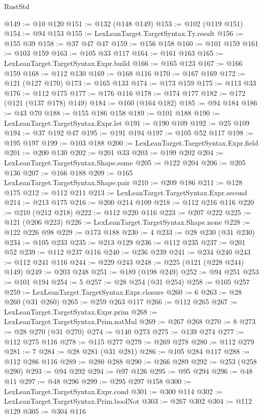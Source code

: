 \begin{lexlean}{RustStd}
\begin{coremodule}
@149 := @10 @120
@151 := @132 (@148 @149)
@153 := @102 (@119 @151)
@154 := @94 @153
@155 := LexLeanTarget.TargetSyntax.Ty.result
@156 := @155 @39
@158 := @37 @47 @47
@159 := @156 @158
@160 := @101 @159
@161 := @103 @159
@163 := @105 @33 @117
@164 := @161 @163
@165 := LexLeanTarget.TargetSyntax.Expr.build
@166 := @165 @123
@167 := @166 @159
@168 := @112 @130
@169 := @168 @116
@170 := @167 @169
@172 := @121 (@127 @170)
@173 := @165 @133
@174 := @173 @159
@175 := @113 @33
@176 := @112 @175
@177 := @176 @116
@178 := @174 @177
@182 := @172 (@121 (@137 @178) @149)
@184 := @160 (@164 @182)
@185 := @94 @184
@186 := @43 @70
@188 := @155 @186 @158
@189 := @101 @188
@190 := LexLeanTarget.TargetSyntax.Expr.let
@191 := @190 @109
@192 := @25 @109
@194 := @37 @192 @47
@195 := @191 @194
@197 := @105 @52 @117
@198 := @195 @197
@199 := @103 @188
@200 := LexLeanTarget.TargetSyntax.Expr.field
@201 := @200 @130
@202 := @201 @33
@203 := @199 @202
@204 := LexLeanTarget.TargetSyntax.Shape.some
@205 := @122 @204
@206 := @205 @136
@207 := @166 @188
@209 := @165 LexLeanTarget.TargetSyntax.Shape.pair
@210 := @209 @186
@211 := @128 @175
@212 := @112 @211
@213 := LexLeanTarget.TargetSyntax.Expr.second
@214 := @213 @175
@216 := @200 @214 @109
@218 := @112 @216 @116
@220 := @210 (@212 @218)
@222 := @112 @220 @116
@223 := @207 @222
@225 := @121 (@206 @223)
@226 := LexLeanTarget.TargetSyntax.Shape.none
@228 := @122 @226 @98
@229 := @173 @188
@230 := 4
@233 := @28 @230 (@31 @230)
@234 := @105 @233
@235 := @213 @129
@236 := @112 @235
@237 := @201 @52
@239 := @112 @237 @116
@240 := @236 @239
@241 := @234 @240
@243 := @112 @241 @116
@244 := @229 @243
@248 := @225 (@121 (@228 @244) @149)
@249 := @203 @248
@251 := @189 (@198 @249)
@252 := @94 @251
@253 := @101 @194
@254 := 5
@257 := @28 @254 (@31 @254)
@258 := @105 @257
@259 := LexLeanTarget.TargetSyntax.Expr.closure
@260 := 6
@263 := @28 @260 (@31 @260)
@265 := @259 @263 @117
@266 := @112 @265
@267 := LexLeanTarget.TargetSyntax.Expr.prim
@268 := LexLeanTarget.TargetSyntax.Prim.natMul
@269 := @267 @268
@270 := 8
@273 := @28 @270 (@31 @270)
@274 := @140 @273
@275 := @139 @274
@277 := @112 @275 @116
@278 := @115 @277
@279 := @269 @278
@280 := @112 @279
@281 := 7
@284 := @28 @281 (@31 @281)
@286 := @105 @284 @117
@288 := @112 @286 @116
@289 := @280 @288
@290 := @266 @289
@292 := @253 (@258 @290)
@293 := @94 @292
@294 := @97 @126
@295 := @95 @294
@296 := @48 @11
@297 := @48 @296
@299 := @295 @297 @158
@300 := LexLeanTarget.TargetSyntax.Expr.cond
@301 := @300 @114
@302 := LexLeanTarget.TargetSyntax.Prim.boolNot
@303 := @267 @302
@304 := @112 @129
@305 := @304 @116

\end{coremodule}
\end{lexlean}
